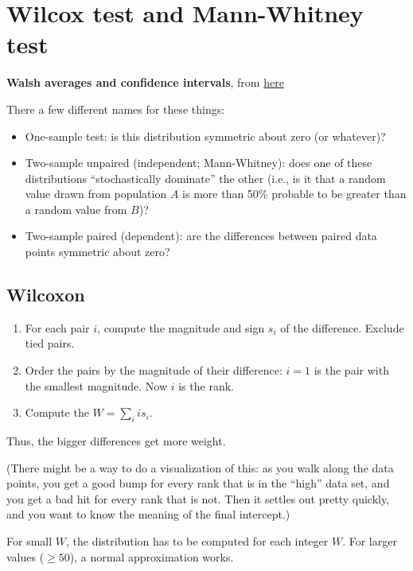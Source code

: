 \documentclass{book}
\providecommand{\tightlist}{%
  \setlength{\itemsep}{0pt}\setlength{\parskip}{0pt}}
\begin{document}
\section{Wilcox test and Mann-Whitney
test}\label{wilcox-test-and-mann-whitney-test}

\textbf{Walsh averages and confidence intervals}, from
\href{http://www.stat.umn.edu/geyer/old03/5102/notes/rank.pdf}{here}

There a few different names for these things:

\begin{itemize}
\tightlist
\item
  One-sample test: is this distribution symmetric about zero (or
  whatever)?
\item
  Two-sample unpaired (independent; Mann-Whitney): does one of these
  distributions ``stochastically dominate'' the other (i.e., is it that
  a random value drawn from population \(A\) is more than 50\% probable
  to be greater than a random value from \(B\))?
\item
  Two-sample paired (dependent): are the differences between paired data
  points symmetric about zero?
\end{itemize}

\subsection{Wilcoxon}\label{wilcoxon}

\begin{enumerate}
\def\labelenumi{\arabic{enumi}.}
\tightlist
\item
  For each pair \(i\), compute the magnitude and sign \(s_i\) of the
  difference. Exclude tied pairs.
\item
  Order the pairs by the magnitude of their difference: \(i=1\) is the
  pair with the smallest magnitude. Now \(i\) is the rank.
\item
  Compute the \(W = \sum_i i s_i\).
\end{enumerate}

Thus, the bigger differences get more weight.

(There might be a way to do a visualization of this: as you walk along
the data points, you get a good bump for every rank that is in the
``high'' data set, and you get a bad hit for every rank that is not.
Then it settles out pretty quickly, and you want to know the meaning of
the final intercept.)

For small \(W\), the distribution has to be computed for each integer
\(W\). For larger values (\(\geq 50\)), a normal approximation works.
\end{document}
